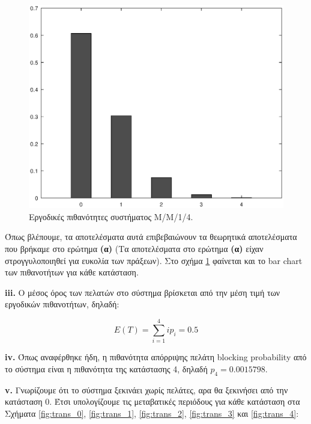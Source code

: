 \documentclass {article}
\newcommand{\english}[1]{\foreignlanguage{english}{#1}}
\begin{document}
\begin{figure}
	\includegraphics[width=\linewidth]{ergodic_probabilities}
	\caption{Εργοδικές πιθανότητες συστήματος Μ/Μ/1/4.}
	\label{fig:probs}
\end{figure}

Όπως βλέπουμε, τα αποτελέσματα αυτά επιβεβαιώνουν τα θεωρητικά αποτελέσματα που βρήκαμε στο ερώτημα \textbf{(α)} (Τα αποτελέσματα στο ερώτημα \textbf{(α)} είχαν στρογγυλοποιηθεί για ευκολία των πράξεων). Στο σχήμα \ref{fig:probs} φαίνεται και το \english{bar chart} των πιθανοτήτων για κάθε κατάσταση.

\english{\textbf{iii.}} Ο μέσος όρος των πελατών στο σύστημα βρίσκεται από την μέση τιμή των εργοδικών πιθανοτήτων, δηλαδή:

\begin{equation}
	E(T) = \sum_{i=1}^{4}{i p_i} = 0.5
\end{equation}

\english{\textbf{iv.}} Όπως αναφέρθηκε ήδη, η πιθανότητα απόρριψης πελάτη \english{blocking probability} από το σύστημα είναι η πιθανότητα της κατάστασης 4, δηλαδή $p_4 = 0.0015798$.

\english{\textbf{v.}} Γνωρίζουμε ότι το σύστημα ξεκινάει χωρίς πελάτες, αρα θα ξεκινήσει από την κατάσταση 0. Έτσι υπολογίζουμε τις μεταβατικές περιόδους για κάθε κατάσταση στα Σχήματα \ref{fig:trans_0}, \ref{fig:trans_1}, \ref{fig:trans_2}, \ref{fig:trans_3} και \ref{fig:trans_4}:
\end{document}
